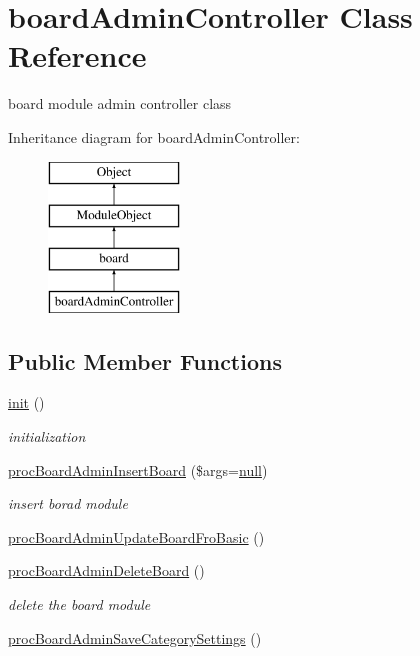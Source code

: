 \hypertarget{classboardAdminController}{}\section{board\+Admin\+Controller Class Reference}
\label{classboardAdminController}


board module admin controller class  


Inheritance diagram for board\+Admin\+Controller\+:\begin{figure}[H]
\begin{center}
\leavevmode
\includegraphics[height=4.000000cm]{classboardAdminController}
\end{center}
\end{figure}
\subsection*{Public Member Functions}
\begin{DoxyCompactItemize}
\item 
\hyperlink{classboardAdminController_a9e73a19f4dd17efa11a5c1340448c75f}{init} ()
\begin{DoxyCompactList}\small\item\em initialization \end{DoxyCompactList}\item 
\hyperlink{classboardAdminController_a4d236333faef58446094c8d5d66228b1}{proc\+Board\+Admin\+Insert\+Board} (\$args=\hyperlink{modernizr_8min_8js_a286f9ec831c5e676eeb493248eab9575}{null})
\begin{DoxyCompactList}\small\item\em insert borad module \end{DoxyCompactList}\item 
\hyperlink{classboardAdminController_a5bb01a312930634bf43e59dd9fef87e5}{proc\+Board\+Admin\+Update\+Board\+Fro\+Basic} ()
\item 
\hyperlink{classboardAdminController_a1a29957a0a3b7751bff0969dfeae966a}{proc\+Board\+Admin\+Delete\+Board} ()
\begin{DoxyCompactList}\small\item\em delete the board module \end{DoxyCompactList}\item 
\hyperlink{classboardAdminController_a0a35a01898405781ecaecca2bc34e709}{proc\+Board\+Admin\+Save\+Category\+Settings} ()
\end{DoxyCompactItemize}
